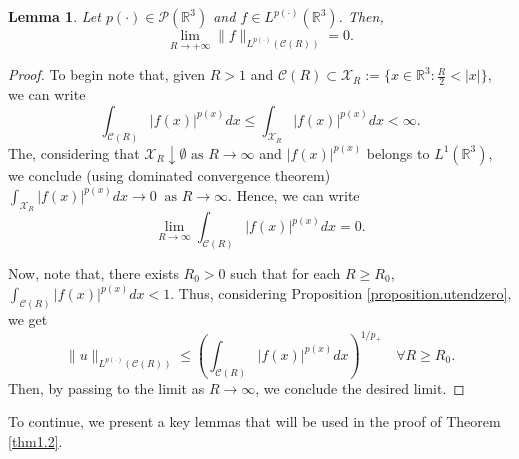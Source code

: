 \documentclass[a4paper,12pt]{amsart}
\theoremstyle{definition}
\theoremstyle{plain}
\newtheorem{lemma}{Lemma}[section]
\def\R{\mathbb{R}}
\def\R{\mathbb R}
\begin{document}
\begin{lemma} \label{Lemma.utendzero}
Let $p(\cdot)\in \mathcal{P}(\R^3 )$  and $f\in L^{p(\cdot)}(\R^3 )$. 
Then, 
\begin{equation}
\lim_{R\to +\infty} \| f\|_{L^{p(\cdot)}(\mathcal{C}( R)   )} =0
.
\end{equation}
\end{lemma}
%
\begin{proof}
To begin note that, given $R>1$ and $\mathcal{C}( R)   \subset \mathcal{X}_R := \{ x\in \R^3 : \frac R 2 < |x| \}$, we can write 
\begin{equation}
\int_{\mathcal{C}( R)  } |f(x)|^{p(x)}dx
\leq 
\int_{\mathcal{X}_R} |f(x)|^{p(x)}dx<\infty.
\end{equation}
The, considering that  $\mathcal{X}_R \downarrow \emptyset \text{ as } R \to \infty $ and $|f(x)|^{p(x)}$ belongs to $L^1(\mathbb{R}^3)$, we conclude (using dominated convergence theorem)
$ \int_{\mathcal{X}_R} |f(x)|^{p(x)}dx \to  0\   
 \text{ as } R \to \infty .
$
Hence, we can write 
$$
\lim_{R \to \infty}
\int_{\mathcal{C}( R)  } |f(x)|^{p(x)}dx 
=0.$$
 
 

\noindent 
Now, note that, there exists $R_0>0$ such that for each $R \geq R_0$,
$
\int_{\mathcal{C}( R)  } |f(x)|^{p(x)}dx <1.
$
Thus, considering Proposition \ref{proposition.utendzero}, we get 
\[
\|u\|_{L^{p(\cdot)}(\mathcal{C}( R)  )}
\le \left(\int_{\mathcal{C}( R)  } |f(x)|^{p(x)}dx \right)^{1/p_+}
\quad \forall  R \ge R_0.
\]
Then,  by passing to the limit as $R\to\infty$, we conclude the desired limit.
 \end{proof} 

To continue, we present  a key lemmas that will be used in the proof of Theorem \ref{thm1.2}.
\end{document}
